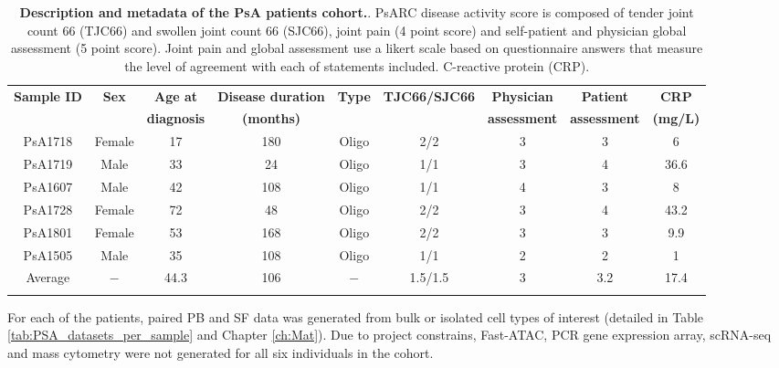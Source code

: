 %
\begin{landscape}
\begin{center}
\begin{longtable}[ht]{c c c c c c c c c}
\caption[Description and metadata of the PsA patients cohort.]{\textbf{Description and metadata of the PsA patients cohort.}. PsARC disease activity score is composed of tender joint count 66 (TJC66) and swollen joint count 66 (SJC66), joint pain (4 point score) and self-patient and physician global assessment (5 point score). Joint pain and global assessment use a likert scale based on questionnaire answers that measure the level of agreement with each of statements included. C-reactive protein (CRP).}
\label{tab:PSA_cohort_metadata} \\
\toprule
\textbf{ Sample ID} & \textbf{Sex} & \textbf{Age at} & \textbf{Disease duration} & \textbf{Type} &\textbf{TJC66/SJC66}  & \textbf{Physician } & \textbf{Patient} & \textbf{CRP} \\
                   &               & \textbf{diagnosis} & \textbf{(months)}      &               &                      & \textbf{assessment} & \textbf{assessment}  & \textbf{(mg/L)} \\
\midrule
\midrule
PsA1718 & Female & 17 & 180 & Oligo  & 2/2 & 3 & 3 & 6 \\
PsA1719	& Male &	33 & 24	 & Oligo &	1/1 &	3 & 4 & 36.6 \\           
PsA1607 &	Male & 42 & 108 &	Oligo &	1/1	& 4 & 3 & 8 \\
PsA1728	& Female & 72	& 48 & Oligo & 2/2 & 3 & 4 & 43.2 \\
PsA1801	& Female & 53 & 168 & Oligo & 2/2 &	3 & 3 & 9.9 \\
PsA1505 & Male & 35 &	108 & Oligo & 1/1 & 2 & 2 & 1 \\	
\midrule
Average		& $-$	&	44.3 & 106 & $-$ & 1.5/1.5 & 3 & 3.2 & 17.4 \\																			
\bottomrule
\medskip
\end{longtable}
\end{center}
\end{landscape}


For each of the patients, paired PB and SF data was generated from bulk or isolated cell types of interest (detailed in Table \ref{tab:PSA_datasets_per_sample} and Chapter \ref{ch:Mat}). Due to project constrains, Fast-ATAC, PCR gene expression array, scRNA-seq and mass cytometry were not generated for all six individuals in the cohort. 

